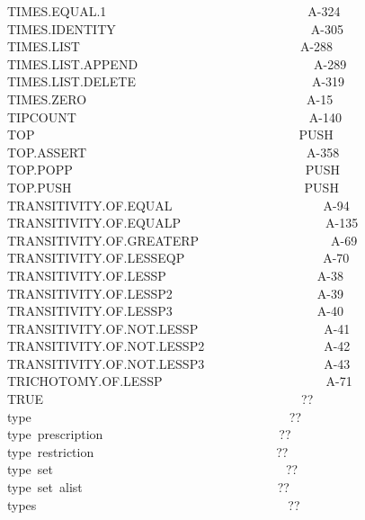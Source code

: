 \documentclass[11pt]{book}
\newenvironment{pubasis}{\begin{flushleft}\ttfamily\small}{\normalsize\rmfamily\end{flushleft}}
\begin{document}
\begin{pubasis}
TIMES.EQUAL.1~~~~~~~~~~~~~~~~~~~~~~~~~~~~~~~~A-324\\
TIMES.IDENTITY~~~~~~~~~~~~~~~~~~~~~~~~~~~~~~~A-305\\
TIMES.LIST~~~~~~~~~~~~~~~~~~~~~~~~~~~~~~~~~~~A-288\\
TIMES.LIST.APPEND~~~~~~~~~~~~~~~~~~~~~~~~~~~~A-289\\
TIMES.LIST.DELETE~~~~~~~~~~~~~~~~~~~~~~~~~~~~A-319\\
TIMES.ZERO~~~~~~~~~~~~~~~~~~~~~~~~~~~~~~~~~~~A-15\\
TIPCOUNT~~~~~~~~~~~~~~~~~~~~~~~~~~~~~~~~~~~~~A-140\\
TOP~~~~~~~~~~~~~~~~~~~~~~~~~~~~~~~~~~~~~~~~~~PUSH\\
TOP.ASSERT~~~~~~~~~~~~~~~~~~~~~~~~~~~~~~~~~~~A-358\\
TOP.POPP~~~~~~~~~~~~~~~~~~~~~~~~~~~~~~~~~~~~~PUSH\\
TOP.PUSH~~~~~~~~~~~~~~~~~~~~~~~~~~~~~~~~~~~~~PUSH\\
TRANSITIVITY.OF.EQUAL~~~~~~~~~~~~~~~~~~~~~~~~A-94\\
TRANSITIVITY.OF.EQUALP~~~~~~~~~~~~~~~~~~~~~~~A-135\\
TRANSITIVITY.OF.GREATERP~~~~~~~~~~~~~~~~~~~~~A-69\\
TRANSITIVITY.OF.LESSEQP~~~~~~~~~~~~~~~~~~~~~~A-70\\
TRANSITIVITY.OF.LESSP~~~~~~~~~~~~~~~~~~~~~~~~A-38\\
TRANSITIVITY.OF.LESSP2~~~~~~~~~~~~~~~~~~~~~~~A-39\\
TRANSITIVITY.OF.LESSP3~~~~~~~~~~~~~~~~~~~~~~~A-40\\
TRANSITIVITY.OF.NOT.LESSP~~~~~~~~~~~~~~~~~~~~A-41\\
TRANSITIVITY.OF.NOT.LESSP2~~~~~~~~~~~~~~~~~~~A-42\\
TRANSITIVITY.OF.NOT.LESSP3~~~~~~~~~~~~~~~~~~~A-43\\
TRICHOTOMY.OF.LESSP~~~~~~~~~~~~~~~~~~~~~~~~~~A-71\\
TRUE~~~~~~~~~~~~~~~~~~~~~~~~~~~~~~~~~~~~~~~~~??\\
type~~~~~~~~~~~~~~~~~~~~~~~~~~~~~~~~~~~~~~~~~??\\
type~prescription~~~~~~~~~~~~~~~~~~~~~~~~~~~~??\\
type~restriction~~~~~~~~~~~~~~~~~~~~~~~~~~~~~??\\
type~set~~~~~~~~~~~~~~~~~~~~~~~~~~~~~~~~~~~~~??\\
type~set~alist~~~~~~~~~~~~~~~~~~~~~~~~~~~~~~~??\\
types~~~~~~~~~~~~~~~~~~~~~~~~~~~~~~~~~~~~~~~~??\\

\end{pubasis}
\end{document}
